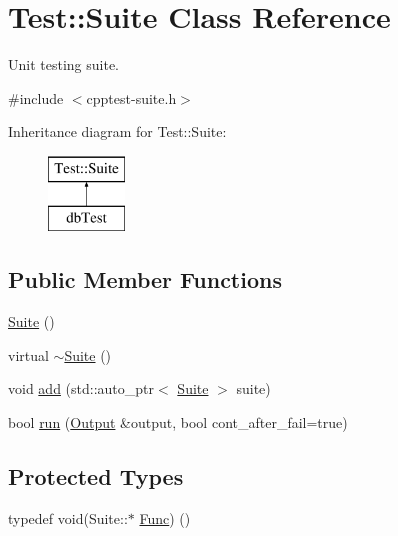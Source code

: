 \hypertarget{class_test_1_1_suite}{}\section{Test\+:\+:Suite Class Reference}
\label{class_test_1_1_suite}


Unit testing suite.  




{\ttfamily \#include $<$cpptest-\/suite.\+h$>$}

Inheritance diagram for Test\+:\+:Suite\+:\begin{figure}[H]
\begin{center}
\leavevmode
\includegraphics[height=2.000000cm]{class_test_1_1_suite}
\end{center}
\end{figure}
\subsection*{Public Member Functions}
\begin{DoxyCompactItemize}
\item 
\mbox{\hyperlink{class_test_1_1_suite_a8cb51a002cf4e675820f91fe03ec9117}{Suite}} ()
\item 
virtual \mbox{\hyperlink{class_test_1_1_suite_a2396d55bb8f9277e19dfdd4fd35421ec}{$\sim$\+Suite}} ()
\item 
void \mbox{\hyperlink{class_test_1_1_suite_a0237b63fc694ecb133d023cf2d6ab271}{add}} (std\+::auto\+\_\+ptr$<$ \mbox{\hyperlink{class_test_1_1_suite}{Suite}} $>$ suite)
\item 
bool \mbox{\hyperlink{class_test_1_1_suite_ad17746e218da79c537bc9d21e389f570}{run}} (\mbox{\hyperlink{class_test_1_1_output}{Output}} \&output, bool cont\+\_\+after\+\_\+fail=true)
\end{DoxyCompactItemize}
\subsection*{Protected Types}
\begin{DoxyCompactItemize}
\item 
typedef void(Suite\+::$\ast$ \mbox{\hyperlink{class_test_1_1_suite_a87c40a9c763fc3221bee0e70c431038f}{Func}}) ()
\end{DoxyCompactItemize}
